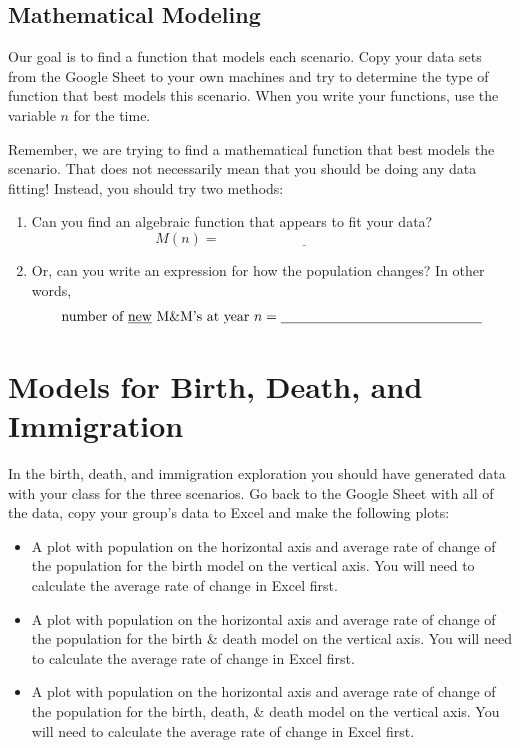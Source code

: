 \subsection*{Mathematical Modeling}
Our goal is to find a function that models each scenario. Copy your data sets from the
Google Sheet to your own machines and try to determine the type of function that best
models this scenario.  When you write your functions, use the variable $n$ for the time.  

Remember, we are trying to find a mathematical function that best models the scenario.
That does not necessarily mean that you should be doing any data fitting!  
Instead, you should try two methods:
\begin{enumerate}
    \item Can you find an algebraic function that appears to fit your data?
        \[ M(n) = \underline{\hspace{2in}} \]
    \item Or, can you write an expression for
        how the population changes? In other words,
        \[ \text{number of \underline{new} M\&M's at year $n$} = \underline{\hspace{2in}} \]
\end{enumerate}


\newpage\section{Models for Birth, Death, and Immigration}
\begin{problem}
    In the birth, death, and immigration exploration you should have generated data with your
    class for the three scenarios. Go back to the Google Sheet with all of the data, copy
    your group's data to Excel and make the following plots:
    \begin{itemize}
        \item A plot with population on the horizontal axis and average rate of change of the
            population for the birth model on the vertical axis.  You will need to
            calculate the average rate of change in Excel first.
        \item A plot with population on the horizontal axis and average rate of change of the
            population for the birth \& death model on the vertical axis.  You will need
            to calculate the average rate of change in Excel first.
        \item A plot with population on the horizontal axis and average rate of change of the
            population for the birth, death, \& death model on the vertical axis.  You
            will need to calculate the average rate of change in Excel first.
    \end{itemize}
\end{problem}

